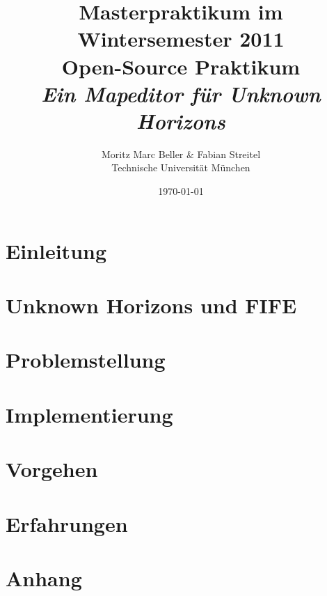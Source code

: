 \documentclass[german]{scrartcl}
\author{Moritz Marc Beller \& Fabian Streitel \\ Technische Universität München}
\title{Masterpraktikum im Wintersemester 2011 \\
Open-Source Praktikum \\
\textit{Ein Mapeditor für Unknown Horizons}}
\date{\today} %
\begin{document}
\maketitle{}

\section{Einleitung}


\section{Unknown Horizons und FIFE}


\section{Problemstellung}


\section{Implementierung}


\section{Vorgehen}


\section{Erfahrungen}


\section*{Anhang}


{}
\end{document}

